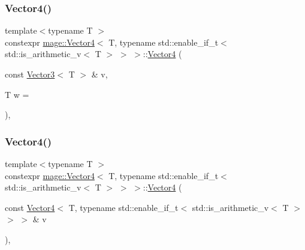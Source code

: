 \subsubsection{\texorpdfstring{Vector4()}{Vector4()}\hspace{0.1cm}{\footnotesize\ttfamily [5/8]}}
{\footnotesize\ttfamily template$<$typename T $>$ \\
constexpr \hyperlink{structmage_1_1_vector4}{mage\+::\+Vector4}$<$ T, typename std\+::enable\+\_\+if\+\_\+t$<$ std\+::is\+\_\+arithmetic\+\_\+v$<$ T $>$ $>$ $>$\+::\hyperlink{structmage_1_1_vector4}{Vector4} (\begin{DoxyParamCaption}\item[{const \hyperlink{structmage_1_1_vector3}{Vector3}$<$ T $>$ \&}]{v,  }\item[{T}]{w = {} }\end{DoxyParamCaption})\hspace{0.3cm}{\ttfamily [explicit]}, {\ttfamily [noexcept]}}

\hypertarget{structmage_1_1_vector4_3_01_t_00_01typename_01std_1_1enable__if__t_3_01std_1_1is__arithmetic__v_3_01_t_01_4_01_4_01_4_ad0f131d28d7e1d036e009a37070910dc}{}\label{structmage_1_1_vector4_3_01_t_00_01typename_01std_1_1enable__if__t_3_01std_1_1is__arithmetic__v_3_01_t_01_4_01_4_01_4_ad0f131d28d7e1d036e009a37070910dc} 
\subsubsection{\texorpdfstring{Vector4()}{Vector4()}\hspace{0.1cm}{\footnotesize\ttfamily [6/8]}}
{\footnotesize\ttfamily template$<$typename T $>$ \\
constexpr \hyperlink{structmage_1_1_vector4}{mage\+::\+Vector4}$<$ T, typename std\+::enable\+\_\+if\+\_\+t$<$ std\+::is\+\_\+arithmetic\+\_\+v$<$ T $>$ $>$ $>$\+::\hyperlink{structmage_1_1_vector4}{Vector4} (\begin{DoxyParamCaption}\item[{const \hyperlink{structmage_1_1_vector4}{Vector4}$<$ T, typename std\+::enable\+\_\+if\+\_\+t$<$ std\+::is\+\_\+arithmetic\+\_\+v$<$ T $>$ $>$ $>$ \&}]{v }\end{DoxyParamCaption})\hspace{0.3cm}{\ttfamily [default]}, {\ttfamily [noexcept]}}

